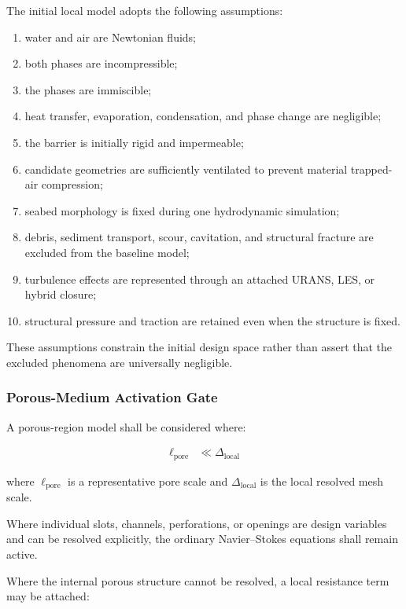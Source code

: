 The initial local model adopts the following assumptions:

\begin{enumerate}
  \item water and air are Newtonian fluids;
  \item both phases are incompressible;
  \item the phases are immiscible;
  \item heat transfer, evaporation, condensation, and phase change
    are negligible;
  \item the barrier is initially rigid and impermeable;
  \item candidate geometries are sufficiently ventilated to prevent
    material trapped-air compression;
  \item seabed morphology is fixed during one hydrodynamic
    simulation;
  \item debris, sediment transport, scour, cavitation, and structural
    fracture are excluded from the baseline model;
  \item turbulence effects are represented through an attached URANS,
    LES, or hybrid closure;
  \item structural pressure and traction are retained even when the
    structure is fixed.
\end{enumerate}

These assumptions constrain the initial design space rather than assert
that the excluded phenomena are universally negligible.

\subsubsection{Porous-Medium Activation Gate}
\label{sec:res-mod-asm-local-porous-gate}

A porous-region model shall be considered where:

\begin{align}
  \ell_{\mathrm{pore}}
  &\ll
  \Delta_{\mathrm{local}}
  \label{eq:res-mod-asm-porous-scale-separation}
\end{align}

where $\ell_{\mathrm{pore}}$ is a representative pore scale and
$\Delta_{\mathrm{local}}$ is the local resolved mesh scale.

Where individual slots, channels, perforations, or openings are design
variables and can be resolved explicitly, the ordinary Navier--Stokes
equations shall remain active.

Where the internal porous structure cannot be resolved, a local
resistance term may be attached:

